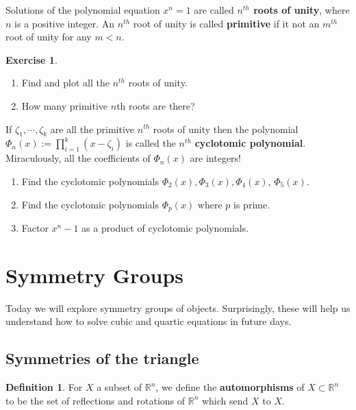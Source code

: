 \documentclass[reqno, 12pt, letter]{article}
\theoremstyle{plain}
\theoremstyle{definition}
\newtheorem{definition}[theorem]{Definition}
\newtheorem{exercise}[theorem]{Exercise}
\theoremstyle{remark}
\numberwithin{equation}{section}
\newcommand\br{{\mathbb R}}
\begin{document}
	Solutions of the polynomial equation $ x^n = 1$ are called \textbf{$n^{th}$ roots of unity}, where $ n$ is a positive integer. An $ n^{th}$ root of unity is called \textbf{primitive} if it not an $ m^{th}$ root of unity for any $ m < n$.
	
	\begin{exercise} $ $
		\begin{enumerate}
			\item Find  and plot all the $ n^{th}$ roots of unity. 
			\item How many primitive $n$th roots are there? 
		\end{enumerate}
		If $ \zeta_1, \cdots, \zeta_k$ are all the primitive $ n^{th}$ roots of unity then the polynomial $ \Phi_n(x) := \prod _{i=1}^k (x - \zeta_i)$ is called the $ n^{th}$ \textbf{cyclotomic polynomial}. Miraculously, all the coefficients of $ \Phi_n(x)$ are integers!
		\begin{enumerate}[resume]
			\item Find the cyclotomic polynomials $ \Phi_2(x), \Phi_3(x), \Phi_4(x)$, $ \Phi_5(x)$.
			\item Find the cyclotomic polynomials $ \Phi_p(x)$ where $ p$ is prime.
			\item Factor $ x^n - 1$ as a product of cyclotomic polynomials.
		\end{enumerate}
	\end{exercise}
	

\newpage
\section{Symmetry Groups}

Today we will explore symmetry groups of objects. Surprisingly, these will help us understand
how to solve cubic and quartic equations in future days.

\subsection{Symmetries of the triangle}

\begin{definition}
	\label{definition:automorphisms}
	For $X$ a subset of $\br^n$, we define the {\bf automorphisms} of $X \subset \br^n$ to be the set of
	reflections and rotations of $\br^n$ which send $X$ to $X$.
\end{definition}
\end{document}

